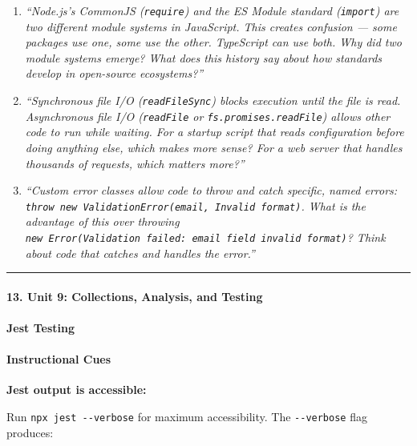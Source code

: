 \documentclass[
  justified,
  openright,
]{tufte-book}
\let\subsection\paragraph
\let\paragraph\paragraph
\let\subsection\paragraph
\let\paragraph\paragraph
\begin{document}
\begin{enumerate}
\def\labelenumi{\arabic{enumi}.}
\item
  \emph{``Node.js's CommonJS (\texttt{require}) and the ES Module
  standard (\texttt{import}) are two different module systems in
  JavaScript. This creates confusion --- some packages use one, some use
  the other. TypeScript can use both. Why did two module systems emerge?
  What does this history say about how standards develop in open-source
  ecosystems?''}
\item
  \emph{``Synchronous file I/O (\texttt{readFileSync}) blocks execution
  until the file is read. Asynchronous file I/O (\texttt{readFile} or
  \texttt{fs.promises.readFile}) allows other code to run while waiting.
  For a startup script that reads configuration before doing anything
  else, which makes more sense? For a web server that handles thousands
  of requests, which matters more?''}
\item
  \emph{``Custom error classes allow code to throw and catch specific,
  named errors:
  \texttt{throw\ new\ ValidationError(\textquotesingle{}email\textquotesingle{},\ \textquotesingle{}Invalid\ format\textquotesingle{})}.
  What is the advantage of this over throwing
  \texttt{new\ Error(\textquotesingle{}Validation\ failed:\ email\ field\ invalid\ format\textquotesingle{})}?
  Think about code that catches and handles the error.''}
\end{enumerate}

\begin{center}\rule{0.5\linewidth}{0.5pt}\end{center}

\subsection{13. Unit 9: Collections, Analysis, and
Testing}\label{unit-9-collections-analysis-and-testing}

\subsection{Jest Testing}\label{jest-testing}

\paragraph{Instructional Cues}\label{instructional-cues-20}

\textbf{Jest output is accessible:}

Run \texttt{npx\ jest\ -\/-verbose} for maximum accessibility. The
\texttt{-\/-verbose} flag produces:
\end{document}
